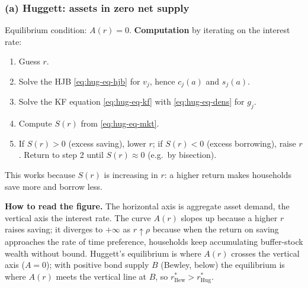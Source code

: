 \subsubsection*{(a) Huggett: assets in zero net supply}
Equilibrium condition: $A(r)=0$. \textbf{Computation} by iterating on the interest rate:
\begin{enumerate}
  \item Guess $r$.
  \item Solve the HJB \eqref{eq:hug-eq-hjb} for $v_j$, hence $c_j(a)$ and $s_j(a)$.
  \item Solve the KF equation \eqref{eq:hug-eq-kf} with \eqref{eq:hug-eq-dens} for $g_j$.
  \item Compute $S(r)$ from \eqref{eq:hug-eq-mkt}.
  \item If $S(r)>0$ (excess saving), lower $r$; if $S(r)<0$ (excess borrowing), raise $r$. Return to step 2 until $S(r)\approx0$ (e.g.\ by bisection).
\end{enumerate}
This works because $S(r)$ is increasing in $r$: a higher return makes households save more and borrow less.

\begin{center}
\end{center}
\textbf{How to read the figure.} The horizontal axis is aggregate asset demand, the vertical axis the interest rate. The curve $A(r)$ slopes up because a higher $r$ raises saving; it diverges to $+\infty$ as $r\uparrow\rho$ because when the return on saving approaches the rate of time preference, households keep accumulating buffer-stock wealth without bound. Huggett's equilibrium is where $A(r)$ crosses the vertical axis ($A=0$); with positive bond supply $B$ (Bewley, below) the equilibrium is where $A(r)$ meets the vertical line at $B$, so $r^*_{\text{Bew}}>r^*_{\text{Hug}}$.


